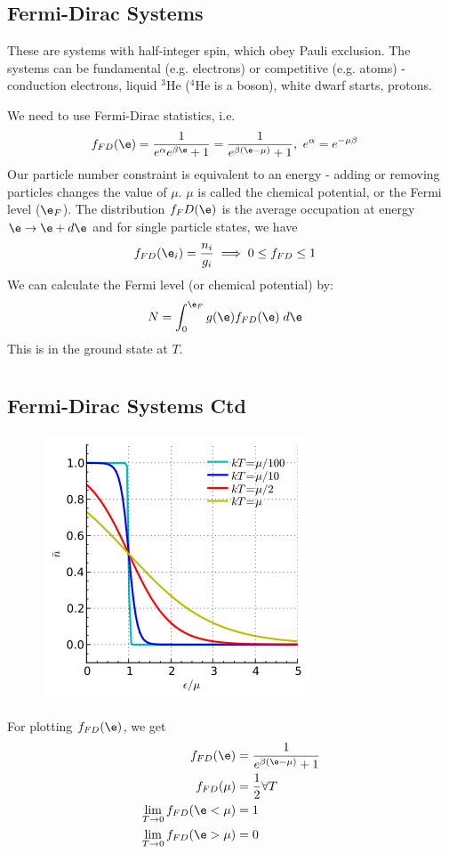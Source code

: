 \documentclass[a4paper, 11pt, normalem]{report}
\begin{document}
\section{Fermi-Dirac Systems}
These are systems with half-integer spin, which obey Pauli exclusion. 
The systems can be fundamental (e.g. electrons) or competitive (e.g. atoms) - conduction electrons, liquid $^3$He ($^4$He is a boson), white dwarf starts, protons.

We need to use Fermi-Dirac statistics, i.e.
\begin{align}
    f_{FD}(\e) &= \frac{1}{e^{\alpha}e^{\beta\e} + 1} = \frac{1}{e^{\beta(\e-\mu)}+1},~ e^{\alpha} = e^{-\mu\beta}
\end{align}
Our particle number constraint is equivalent to an energy - adding or removing particles changes the value of $\mu$.
$\mu$ is called the chemical potential, or the Fermi level ($\e_F$).
The distribution $f_FD(\e)$ is the average occupation at energy $\e \to \e+d\e$ and for single particle states, we have
\begin{align}
    f_{FD}(\e_i) &= \frac{n_i}{g_i} \implies 0 \leq f_{FD} \leq 1 
\end{align}
We can calculate the Fermi level (or chemical potential) by:
\begin{align}
    N &= \int_0^{\e_F} g(\e)f_{FD}(\e)\;d\e
\end{align}
This is in the ground state at $T$.

\chapter{}
\section{Fermi-Dirac Systems Ctd}
\begin{figure}
    \centering
    \includegraphics[scale=0.6]{fd.png}
\end{figure}
For plotting $f_{FD}(\e)$, we get
\begin{align}
    f_{FD}(\e) &= \frac{1}{e^{\beta(\e-\mu)}+1} \\
    f_{FD}(\mu) &= \frac{1}{2} \forall T \\
    \lim_{T\to 0} f_{FD}(\e < \mu) &= 1 \\
    \lim_{T\to 0} f_{FD}(\e > \mu) &= 0 
\end{align}
\end{document}
